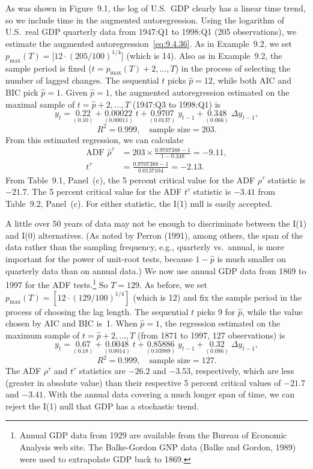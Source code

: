 \begin{example}
\label{ex:9.3}
As was shown in Figure~9.1,
the log of U.S.\ GDP clearly has a linear time trend, so we include time in
the augmented autoregression. Using the logarithm of U.S.\ real GDP quarterly data from 1947:Q1 to 1998:Q1 (205 observations), we estimate the
augmented autoregression~\eqref{eq:9.4.36}. As in Example~9.2, we set $p_{\max}(T) =
\big[12 \cdot (205/100)^{1/4}\big]$ (which is 14). Also as in Example~9.2, the sample period
is fixed ($t = p_{\max}(T) + 2, \ldots, T$) in the process of selecting the number of
lagged changes. The sequential $t$ picks $\hat{p} = 12$, while both AIC and BIC
pick $\hat{p} = 1$. Given $\hat{p} = 1$, the augmented autoregression estimated on the
maximal sample of $t = \hat{p} + 2, \ldots, T$ (1947:Q3 to 1998:Q1) is
\[
y_t = \underset{(0.10)}{0.22} + \underset{(0.00011)}{0.00022}\;t
+ \underset{(0.0137)}{0.9707}\;y_{t-1}
+ \underset{(0.066)}{0.348}\;\Delta y_{t-1},
\]
\[
R^2 = 0.999, \quad \text{sample size} = 203.
\]
From this estimated regression, we can calculate
\begin{align*}
\text{ADF } \hat{\rho}^\tau &= 203 \times \frac{0.9707388 - 1}{1 - 0.348} = -9.11, \\
t^\tau &= \frac{0.9707388 - 1}{0.0137104} = -2.13.
\end{align*}
From Table~9.1, Panel~(c), the 5 percent critical value for the ADF $\rho^\tau$ statistic
is $-21.7$. The 5 percent critical value for the ADF $t^\tau$ statistic is $-3.41$ from
Table~9.2, Panel~(c). For either statistic, the I(1) null is easily accepted.

A little over 50 years of data may not be enough to discriminate between
the I(1) and I(0) alternatives. (As noted by Perron (1991), among others,
the span of the data rather than the sampling frequency, e.g., quarterly vs.\
annual, is more important for the power of unit-root tests, because $1 - \hat{p}$ is
much smaller on quarterly data than on annual data.) We now use annual
GDP data from 1869 to 1997 for the ADF tests.\footnote{Annual GDP data from 1929 are available from the Bureau of Economic Analysis web site. The Balke-Gordon GNP data (Balke and Gordon, 1989) were used to extrapolate GDP back to 1869.} So $T = 129$. As before,
we set $p_{\max}(T) = [12 \cdot (129/100)^{1/4}]$ (which is 12) and fix the sample period
in the process of choosing the lag length. The sequential $t$ picks 9 for $\hat{p}$,
while the value chosen by AIC and BIC is~1. When $\hat{p} = 1$, the regression
estimated on the maximum sample of $t = \hat{p} + 2, \ldots, T$ (from 1871 to 1997,
127 observations) is
\[
y_t = \underset{(0.18)}{0.67} + \underset{(0.0014)}{0.0048}\;t
+ \underset{(0.03989)}{0.85886}\;y_{t-1}
+ \underset{(0.086)}{0.32}\;\Delta y_{t-1},
\]
\[
R^2 = 0.999, \quad \text{sample size} = 127.
\]
The ADF $\rho^\tau$ and $t^\tau$ statistics are $-26.2$ and $-3.53$, respectively, which are
less (greater in absolute value) than their respective 5 percent critical values
of $-21.7$ and $-3.41$. With the annual data covering a much longer span of
time, we can reject the I(1) null that GDP has a stochastic trend.
\end{example}

